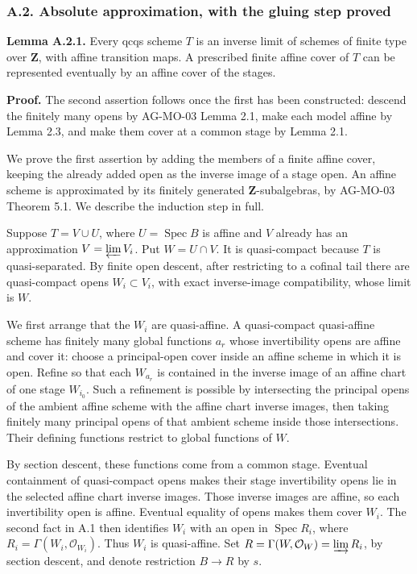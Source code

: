 \documentclass[11pt]{article}
\begin{document}
\subsubsection{A.2. Absolute approximation, with the gluing step
proved}\label{a.2.-absolute-approximation-with-the-gluing-step-proved}

\textbf{Lemma A.2.1.} Every qcqs scheme \(T\) is an inverse limit of
schemes of finite type over \(\mathbf Z\), with affine transition maps.
A prescribed finite affine cover of \(T\) can be represented eventually
by an affine cover of the stages.

\textbf{Proof.} The second assertion follows once the first has been
constructed: descend the finitely many opens by AG-MO-03 Lemma 2.1, make
each model affine by Lemma 2.3, and make them cover at a common stage by
Lemma 2.1.

We prove the first assertion by adding the members of a finite affine
cover, keeping the already added open as the inverse image of a stage
open. An affine scheme is approximated by its finitely generated
\(\mathbf Z\)-subalgebras, by AG-MO-03 Theorem 5.1. We describe the
induction step in full.

Suppose \(T=V\cup U\), where \(U=\operatorname{Spec}B\) is affine and
\(V\) already has an approximation \(V=\varprojlim V_i\). Put
\(W=U\cap V\). It is quasi-compact because \(T\) is quasi-separated. By
finite open descent, after restricting to a cofinal tail there are
quasi-compact opens \(W_i\subset V_i\), with exact inverse-image
compatibility, whose limit is \(W\).

We first arrange that the \(W_i\) are quasi-affine. A quasi-compact
quasi-affine scheme has finitely many global functions \(a_r\) whose
invertibility opens are affine and cover it: choose a principal-open
cover inside an affine scheme in which it is open. Refine so that each
\(W_{a_r}\) is contained in the inverse image of an affine chart of one
stage \(W_{i_0}\). Such a refinement is possible by intersecting the
principal opens of the ambient affine scheme with the affine chart
inverse images, then taking finitely many principal opens of that
ambient scheme inside those intersections. Their defining functions
restrict to global functions of \(W\).

By section descent, these functions come from a common stage. Eventual
containment of quasi-compact opens makes their stage invertibility opens
lie in the selected affine chart inverse images. Those inverse images
are affine, so each invertibility open is affine. Eventual equality of
opens makes them cover \(W_i\). The second fact in A.1 then identifies
\(W_i\) with an open in \(\operatorname{Spec}R_i\), where
\(R_i=\Gamma(W_i,\mathcal O_{W_i})\). Thus \(W_i\) is quasi-affine. Set
\(R=\Gamma(W,\mathcal O_W)=\varinjlim R_i\), by section descent, and
denote restriction \(B\to R\) by \(s\).
\end{document}
